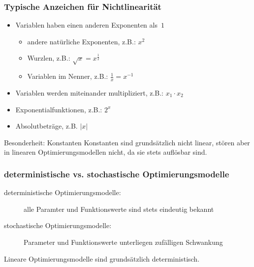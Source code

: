 \begin{frame}
 \frametitle{Typische Anzeichen für Nichtlinearität}
 \begin{itemize}
  \item Variablen haben einen anderen Exponenten als~$1$
  \begin{itemize}
   \item andere natürliche Exponenten, z.B.: $x^2$
   \item Wurzlen, z.B.: $\sqrt{x} = x^{\frac{1}{2}}$
   \item Variablen im Nenner, z.B.: $\frac{1}{x} = x^{-1}$
  \end{itemize}
  \item Variablen werden miteinander multipliziert, z.B.: $x_1\cdot x_2$
  \item Exponentialfunktionen, z.B.: $2^x$
  \item Absolutbeträge, z.B. $|x|$
 \end{itemize}

 \begin{block}{Besonderheit: Konstanten}
  Konstanten sind grundsätzlich nicht linear, stören aber in linearen Optimierungsmodellen nicht, da sie stets auflösbar sind.
 \end{block}
\end{frame}

\begin{frame}
 \frametitle{deterministische vs. stochastische Optimierungsmodelle}
 \begin{description}
  \item[deterministische Optimierungsmodelle:] alle Paramter und Funktionswerte sind stets eindeutig bekannt
  \item[stochastische Optimierungsmodelle:] Parameter und Funktionswerte unterliegen zufälligen Schwankung
 \end{description}
 
 Lineare Optimierungsmodelle sind grundsätzlich deterministisch.
\end{frame}

